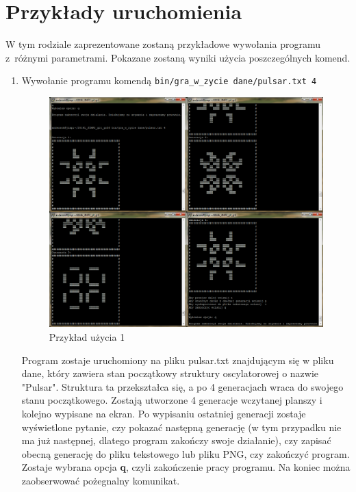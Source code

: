 \documentclass[12pt]{report}
\newcommand{\code}[1]{\texttt{#1}}
\begin{document}
\begin{itemize}
\end{itemize}
\newpage
\section{Przykłady uruchomienia}
W tym rodziale zaprezentowane zostaną przykładowe wywołania programu z~różnymi parametrami. Pokazane zostaną wyniki użycia poszczególnych komend.
\begin{enumerate}
    \item Wywołanie programu komendą \code{bin/gra\_w\_zycie dane/pulsar.txt 4}\par
    \begin{figure}[H]
    \centering
    \includegraphics[width=14cm]{obrazy/przykladuzycia_1.png}
    \caption{Przykład użycia 1}
    \label{przyklad uzycia 1}
    \end{figure}\par
    Program zostaje uruchomiony na pliku pulsar.txt znajdującym się w pliku dane, który zawiera stan początkowy struktury oscylatorowej o nazwie "Pulsar". Struktura ta przekształca się, a po 4 generacjach wraca do swojego stanu początkowego. Zostają utworzone 4 generacje wczytanej planszy i kolejno wypisane na ekran. Po wypisaniu ostatniej generacji zostaje wyświetlone pytanie, czy pokazać następną generację (w tym przypadku nie ma już następnej, dlatego program zakończy swoje działanie), czy zapisać obecną generację do pliku tekstowego lub pliku PNG, czy zakończyć program. Zostaje wybrana opcja \textbf{q}, czyli zakończenie pracy programu. Na koniec można zaobserwować pożegnalny komunikat.

\end{enumerate}
\end{document}
